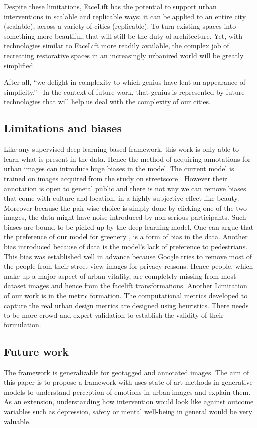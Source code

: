 Despite these limitations, FaceLift has the potential to support urban interventions  in scalable  and replicable ways: it can be applied to an entire city (scalable), across a variety of cities (replicable). To turn existing spaces into something more beautiful, that will still be the duty of architecture. Yet, with technologies similar to FaceLift more readily available, the complex job of recreating restorative spaces in an increasingly urbanized world will be greatly simplified.  


After all, ``we delight in complexity to which genius have lent an appearance of simplicity.''~\cite{de2008architecture} In the context of future work, that genius is represented by future technologies that will help us deal with the complexity of our cities.



\subsection{Limitations and biases}
Like any supervised deep learning based framework, this work is only able to learn what is present in the data. Hence the method of acquiring annotations  for urban images can introduce huge biases in the model. The current model is trained on images acquired from the study on streetscore \cite{naik2014streetscore}. However their annotation is open to general public and there is not way we can remove biases that come with culture and location, in a highly subjective effect like beauty. Moreover because the pair wise choice is simply done by clicking one of the two images, the data might have noise introduced by non-serious participants. Such biases are bound to be picked up by the deep learning model. One can argue that the preference of our model for greenery , is a form of bias in the data. Another bias introduced because of data is the model's lack of preference to pedestrians. This bias was established well in advance because Google tries to remove most of the people from their street view images for privacy reasons. Hence people, which make up a major aspect of urban vitality, are completely missing from most dataset images and hence from the facelift transformations. 
Another Limitation of our work is in the metric formation. The computational metrics developed to capture the real urban design metrics are designed using heuristics. There needs to be more crowd and expert validation to establish the validity of their formulation. 
%
\subsection{Future work}
The framework is generalizable for geotagged and annotated images. The aim of this paper is to propose a framework with uses state of art methods in generative models to understand perception of emotions in urban images and explain them. As an extension, understanding how intervention would look like against outcome variables such as depression, safety or mental well-being in general would be very valuable.
